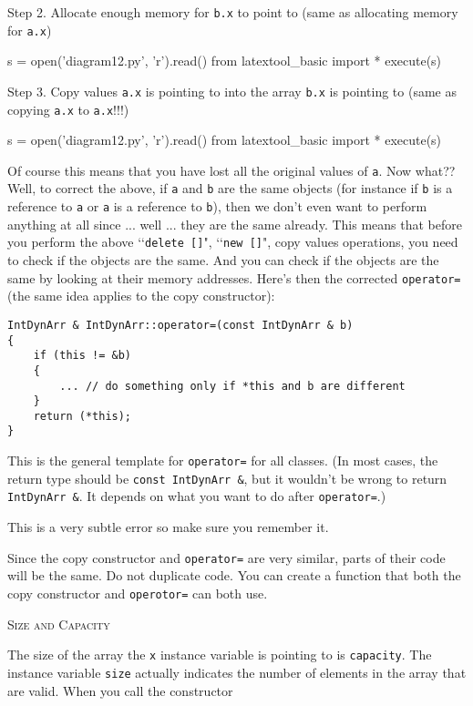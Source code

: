 Step 2.
Allocate enough memory for \verb!b.x! to point to (same as allocating 
memory for \verb!a.x!) 
\begin{python}
s = open('diagram12.py', 'r').read()
from latextool_basic import *
execute(s)
\end{python}

Step 3.
Copy values \verb!a.x! is pointing to into the array \verb!b.x! is pointing to 
(same as copying \verb!a.x! to \verb!a.x!!!!) 
\begin{python}
s = open('diagram12.py', 'r').read()
from latextool_basic import *
execute(s)
\end{python}

Of course this means that you have lost all
the original values of \verb!a!.
Now what?? Well, to correct the above,
if \verb!a! and \verb!b! are the same objects
(for instance if
\verb!b! is a reference to \verb!a! or \verb!a!
is a reference to \verb!b!), 
then we don't even want to perform anything at all since
... well ... they are 
the same already.
This means that before you perform the above
\lq\lq\verb!delete []!", 
\lq\lq\verb!new []!", copy values operations,
you need to check if the objects are the same. 
And you can check if the objects are the same
by looking at their memory 
addresses.
Here's then the corrected \verb!operator=! (the same idea 
applies to the copy constructor):

\begin{Verbatim}[frame=single]
IntDynArr & IntDynArr::operator=(const IntDynArr & b) 
{
    if (this != &b)
    {
        ... // do something only if *this and b are different
    }
    return (*this);
}
\end{Verbatim}

This is the general template for \verb!operator=! for all
classes.
(In most cases, the return type should be
\verb!const IntDynArr &!, but it wouldn't be wrong
to return \verb!IntDynArr &!.
It depends on what you want to do after
\verb!operator=!.)

This is a very subtle error so make sure you remember it.

Since the copy constructor and \verb!operator=! are very similar, parts 
of their code will be the same. Do not duplicate code. You can create a 
function that both the copy constructor and
\verb!operotor=! can both use.



\newpage
\textsc{Size and Capacity}

The size of the array the \verb!x! instance variable is pointing 
to is \verb!capacity!. The instance variable \verb!size! actually 
indicates the number of elements in the array that are valid. When 
you call the constructor


